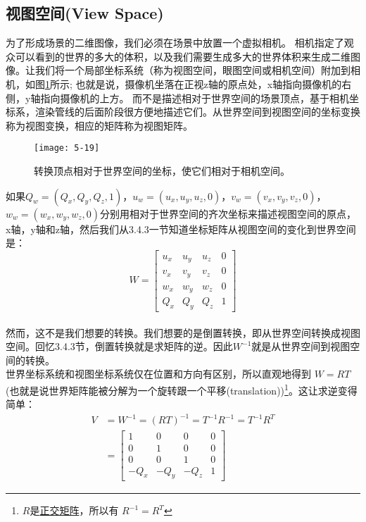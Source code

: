 \subsection{视图空间(View Space)}
\begin{flushleft}
为了形成场景的二维图像，我们必须在场景中放置一个虚拟相机。 相机指定了观众可以看到的世界的多大的体积，以及我们需要生成多大的世界体积来生成二维图像。让我们将一个局部坐标系统（称为视图空间，眼图空间或相机空间）附加到相机，如图\ref{fig:5-19}所示; 也就是说，摄像机坐落在正视z轴的原点处，x轴指向摄像机的右侧，y轴指向摄像机的上方。 而不是描述相对于世界空间的场景顶点，基于相机坐标系，渲染管线的后面阶段很方便地描述它们。从世界空间到视图空间的坐标变换称为视图变换，相应的矩阵称为视图矩阵。\\
\begin{figure}[t]
    \texttt{[image: 5-19]}
    \centering
    \caption{转换顶点相对于世界空间的坐标，使它们相对于相机空间。}
    \label{fig:5-19}
\end{figure}
如果$Q_{w}=(Q_{x},Q_{y},Q_{z},1)$，$u_{w}=(u_{x},u_{y},u_{z},0)$，$v_{w}=(v_{x},v_{y},v_{z},0)$，$w_{w}=(w_{x},w_{y},w_{z},0)$分别用相对于世界空间的齐次坐标来描述视图空间的原点，x轴，y轴和z轴，然后我们从3.4.3一节知道坐标矩阵从视图空间的变化到世界空间是：
$$W=
\begin{bmatrix}
u_{x} & u_{y} & u_{z} & 0\\
v_{x} & v_{y} & v_{z} & 0\\
w_{x} & w_{y} & w_{z} & 0\\
Q_{x} & Q_{y} & Q_{z} & 1
\end{bmatrix}$$\\
然而，这不是我们想要的转换。我们想要的是倒置转换，即从世界空间转换成视图空间。回忆3.4.3节，倒置转换就是求矩阵的逆。因此$W^{-1}$就是从世界空间到视图空间的转换。\\
世界坐标系统和视图坐标系统仅在位置和方向有区别，所以直观地得到 $W=RT$(也就是说世界矩阵能被分解为一个旋转跟一个平移(translation))\footnote{$R$是\href{https://en.wikipedia.org/wiki/Orthogonal_matrix}{\textcolor{linkColor}{正交矩阵}}，所以有 $R^{-1}=R^{T}$}。这让求逆变得简单：
\begin{align*}
V&=W^{-1}=(RT)^{-1}=T^{-1}R^{-1}=T^{-1}R^{T} \\
&=\begin{bmatrix}
1 & 0 & 0 & 0\\
0 & 1 & 0 & 0\\
0 & 0 & 1 & 0\\
-Q_{x} & -Q_{y} & -Q_{z} & 1
\end{bmatrix}

\end{align*}
\end{flushleft}
